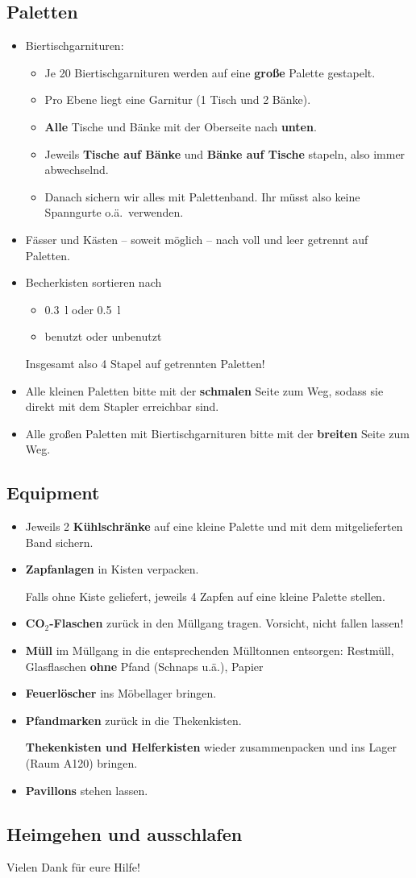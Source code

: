 \subsection{Paletten}
\begin{itemize}
  \item Biertischgarnituren: \begin{itemize}
      \item Je 20 Biertischgarnituren werden auf eine \textbf{große} Palette gestapelt.
      \item Pro Ebene liegt eine Garnitur (1 Tisch und 2 Bänke).
      \item \textbf{Alle} Tische und Bänke mit der Oberseite nach \textbf{unten}.
      \item Jeweils \textbf{Tische auf Bänke} und \textbf{Bänke auf Tische} stapeln, also immer abwechselnd.
      \item Danach sichern wir alles mit Palettenband. Ihr müsst also keine Spanngurte o.ä.\ verwenden.
    \end{itemize}
  \item Fässer und Kästen -- soweit möglich -- nach voll und leer getrennt auf Paletten.
  \item Becherkisten sortieren nach
    \begin{itemize}
      \item \SI{0.3}{\litre} oder \SI{0.5}{\litre}
      \item benutzt oder unbenutzt
    \end{itemize}
    Insgesamt also 4 Stapel auf getrennten Paletten!
  \item Alle kleinen Paletten bitte mit der \textbf{schmalen} Seite zum Weg, sodass sie direkt mit dem Stapler erreichbar sind.
  \item Alle großen Paletten mit Biertischgarnituren bitte mit der \textbf{breiten} Seite zum Weg.
\end{itemize}
\subsection{Equipment}
\begin{itemize}
  \item Jeweils 2 \textbf{Kühlschränke} auf eine kleine Palette und mit dem mitgelieferten Band sichern.
  \item \textbf{Zapfanlagen} in Kisten verpacken.
    
    Falls ohne Kiste geliefert, jeweils 4 Zapfen auf eine kleine Palette stellen.
  \item \textbf{CO$_2$-Flaschen} zurück in den Müllgang tragen. Vorsicht, nicht fallen lassen!
  \item \textbf{Müll} im Müllgang in die entsprechenden Mülltonnen entsorgen: Restmüll, Glasflaschen \textbf{ohne} Pfand (Schnaps u.ä.), Papier
  \item \textbf{Feuerlöscher} ins Möbellager bringen.
  \item \textbf{Pfandmarken} zurück in die Thekenkisten.
    
    \textbf{Thekenkisten und Helferkisten} wieder zusammenpacken und ins Lager (Raum A120) bringen.
  \item \textbf{Pavillons} stehen lassen.
\end{itemize}
\subsection{Heimgehen und ausschlafen \smiley}
Vielen Dank für eure Hilfe!
